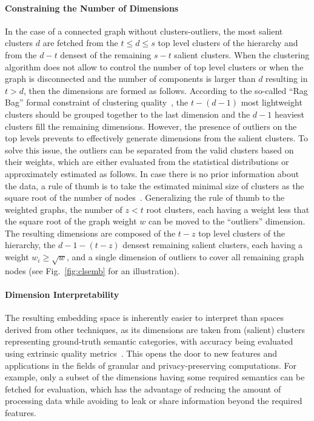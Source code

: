 \documentclass[conference]{IEEEtran}
\begin{document}
\paragraph{Constraining the Number of Dimensions}
In the case of a connected graph without clusters-outliers, the most salient clusters $d$ are fetched from the $t \le d \le s$ top level clusters of the hierarchy and from the $d - t$ densest of the remaining $s - t$ salient clusters. When the clustering algorithm does not allow to control the number of top level clusters or when the graph is disconnected and the number of components is larger than $d$ resulting in $t > d$, then the dimensions are formed as follows. According to the so-called ``Rag Bag'' formal constraint of clustering quality~\cite{Xms19,Amg09}, the $t - (d-1)$ most lightweight clusters should be grouped together to the last dimension and the $d - 1$ heaviest clusters fill the remaining dimensions.
However, the presence of outliers on the top levels prevents to effectively generate dimensions from the salient clusters. To solve this issue, the outliers can be separated from the valid clusters
based on their weights, which are either evaluated from the statistical distributions or approximately estimated as follows.
In case there is no prior information about the data, a rule of thumb is to take the estimated minimal size of clusters as the square root of the number of nodes~\cite{Mard79}. Generalizing the rule of thumb to the weighted graphs, the number of $z < t$ root clusters, each having a weight less that the square root of the graph weight $w$ can be moved to the ``outliers'' dimension. The resulting dimensions are composed of the $t - z$ top level clusters of the hierarchy,
the $d - 1 - (t - z)$ densest remaining salient clusters, each having a weight $w_i \ge \sqrt{w}$, and a single dimension of outliers to cover all remaining graph nodes (see Fig.~\ref{fig:clsemb} for an illustration).  

\paragraph{Dimension Interpretability}
The resulting embedding space is inherently easier to interpret than spaces derived from other techniques, as its dimensions are taken from (salient) clusters representing ground-truth semantic categories, with accuracy being evaluated using extrinsic quality metrics~\cite{Xms19}.  This opens the door to new features and applications in the fields of granular and privacy-preserving computations. For example, only a subset of the dimensions having some required semantics can be fetched for evaluation, which has the advantage of reducing the amount of processing data while avoiding to leak or share information beyond the required features.
\end{document}
